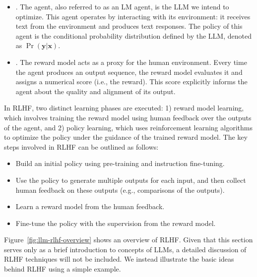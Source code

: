 \begin{itemize}
\item \vspace{0.5em} . The agent, also referred to as an LM agent, is the LLM we intend to optimize. This agent operates by interacting with its environment: it receives text from the environment and produces text responses. The policy of this agent is the conditional probability distribution defined by the LLM, denoted as $\Pr(\mathbf{y} | \mathbf{x})$.
\item \vspace{0.3em} . The reward model acts as a proxy for the human environment. Every time the agent produces an output sequence, the reward model evaluates it and assigns a numerical score (i.e., the reward). This score explicitly informs the agent about the quality and alignment of its output.
\end{itemize}
\vspace{0.5em}

In RLHF, two distinct learning phases are executed: 1) reward model learning, which involves training the reward model using human feedback over the outputs of the agent, and 2) policy learning, which uses reinforcement learning algorithms to optimize the policy under the guidance of the trained reward model. The key steps involved in RLHF can be outlined as follows:

\begin{itemize}
\item \vspace{0.5em} Build an initial policy using pre-training and instruction fine-tuning.
\item \vspace{0.3em} Use the policy to generate multiple outputs for each input, and then collect human feedback on these outputs (e.g., comparisons of the outputs).
\item \vspace{0.3em} Learn a reward model from the human feedback.
\item \vspace{0.3em} Fine-tune the policy with the supervision from the reward model.
\end{itemize}
\vspace{0.5em}

Figure~\ref{fig:llm-rlhf-overview} shows an overview of RLHF. Given that this section serves only as a brief introduction to concepts of LLMs, a detailed discussion of RLHF techniques will not be included. We instead illustrate the basic ideas behind RLHF using a simple example.

